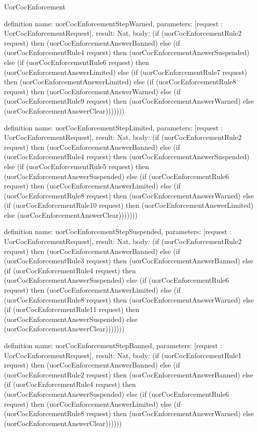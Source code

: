 \begin{lexlean}{UorCocEnforcement}
\begin{semanticmodule}
definition{
  name: uorCocEnforcementStepWarned,
  parameters: [request : UorCocEnforcementRequest],
  result: Nat,
  body: (if (uorCocEnforcementRule2 request) then (uorCocEnforcementAnswerBanned) else (if (uorCocEnforcementRule4 request) then (uorCocEnforcementAnswerSuspended) else (if (uorCocEnforcementRule6 request) then (uorCocEnforcementAnswerLimited) else (if (uorCocEnforcementRule7 request) then (uorCocEnforcementAnswerLimited) else (if (uorCocEnforcementRule8 request) then (uorCocEnforcementAnswerWarned) else (if (uorCocEnforcementRule9 request) then (uorCocEnforcementAnswerWarned) else (uorCocEnforcementAnswerClear)))))))
}

definition{
  name: uorCocEnforcementStepLimited,
  parameters: [request : UorCocEnforcementRequest],
  result: Nat,
  body: (if (uorCocEnforcementRule2 request) then (uorCocEnforcementAnswerBanned) else (if (uorCocEnforcementRule4 request) then (uorCocEnforcementAnswerSuspended) else (if (uorCocEnforcementRule5 request) then (uorCocEnforcementAnswerSuspended) else (if (uorCocEnforcementRule6 request) then (uorCocEnforcementAnswerLimited) else (if (uorCocEnforcementRule8 request) then (uorCocEnforcementAnswerWarned) else (if (uorCocEnforcementRule10 request) then (uorCocEnforcementAnswerLimited) else (uorCocEnforcementAnswerClear)))))))
}

definition{
  name: uorCocEnforcementStepSuspended,
  parameters: [request : UorCocEnforcementRequest],
  result: Nat,
  body: (if (uorCocEnforcementRule2 request) then (uorCocEnforcementAnswerBanned) else (if (uorCocEnforcementRule3 request) then (uorCocEnforcementAnswerBanned) else (if (uorCocEnforcementRule4 request) then (uorCocEnforcementAnswerSuspended) else (if (uorCocEnforcementRule6 request) then (uorCocEnforcementAnswerLimited) else (if (uorCocEnforcementRule8 request) then (uorCocEnforcementAnswerWarned) else (if (uorCocEnforcementRule11 request) then (uorCocEnforcementAnswerSuspended) else (uorCocEnforcementAnswerClear)))))))
}

definition{
  name: uorCocEnforcementStepBanned,
  parameters: [request : UorCocEnforcementRequest],
  result: Nat,
  body: (if (uorCocEnforcementRule1 request) then (uorCocEnforcementAnswerBanned) else (if (uorCocEnforcementRule2 request) then (uorCocEnforcementAnswerBanned) else (if (uorCocEnforcementRule4 request) then (uorCocEnforcementAnswerSuspended) else (if (uorCocEnforcementRule6 request) then (uorCocEnforcementAnswerLimited) else (if (uorCocEnforcementRule8 request) then (uorCocEnforcementAnswerWarned) else (uorCocEnforcementAnswerClear))))))
}


\end{semanticmodule}
\end{lexlean}
